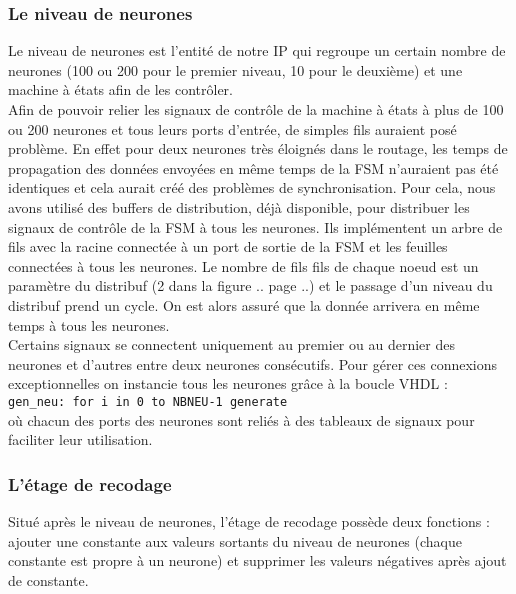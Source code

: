 \subsubsection{Le niveau de neurones}
Le niveau de neurones est l'entité de notre IP qui regroupe un certain nombre
de neurones (100 ou 200 pour le premier niveau, 10 pour le deuxième) et une
machine à états afin de les contrôler. \\
Afin de pouvoir relier les signaux de contrôle de la machine à états à plus de
100 ou 200 neurones et tous leurs ports d'entrée, de simples fils auraient posé
problème. En effet pour deux neurones très éloignés dans le routage, les temps
de propagation des données envoyées en même temps de la FSM n'auraient pas été
identiques et cela aurait créé des problèmes de synchronisation. Pour cela, nous
avons utilisé des buffers de distribution, déjà disponible, pour distribuer les
signaux de contrôle de la FSM à tous les neurones. Ils implémentent un arbre
de fils avec la racine connectée à un port de sortie de la FSM et les feuilles
connectées à tous les neurones. Le nombre de fils fils de chaque noeud est un
paramètre du distribuf (2 dans la figure .. page ..) et le passage d'un niveau
du distribuf prend un cycle. On est alors assuré que la donnée arrivera en même
temps à tous les neurones. \\
Certains signaux se connectent uniquement au premier ou au dernier des neurones
et d'autres entre deux neurones consécutifs. Pour gérer ces connexions
exceptionnelles on instancie tous les neurones grâce à la boucle VHDL :\\
\texttt{gen\_neu: for i in 0 to NBNEU-1 generate} \\
où chacun des ports des neurones sont reliés à des tableaux de signaux pour
faciliter leur utilisation.

\subsubsection{L'étage de recodage}
\label{plan:recode}

Situé après le niveau de neurones, l'étage de recodage possède deux fonctions :
ajouter une constante aux valeurs sortants du niveau de neurones (chaque
constante est propre à un neurone) et
supprimer les valeurs négatives après ajout de constante.

